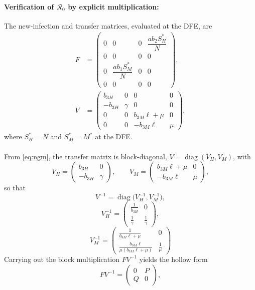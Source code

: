 \documentclass[a4paper,fleqn]{cas-dc}
\begin{document}
\paragraph{Verification of $\mathcal{R}_0$ by explicit multiplication:}
\label{app:ngm_verify}

The new-infection and transfer matrices, evaluated at the DFE, are
\begin{equation}
\begin{aligned}
F &= \begin{pmatrix}
0 & 0 & 0 & \dfrac{ab_2 S_H^*}{N} \\
0 & 0 & 0 & 0 \\
0 & \dfrac{ab_1 S_M^*}{N} & 0 & 0 \\
0 & 0 & 0 & 0
\end{pmatrix}, \\[6pt]
V &= \begin{pmatrix}
b_{3H} & 0 & 0 & 0 \\
-b_{3H} & \gamma & 0 & 0 \\
0 & 0 & b_{3M}\ell + \mu & 0 \\
0 & 0 & -b_{3M}\ell & \mu
\end{pmatrix},
\end{aligned}
\label{eq:ngm}
\end{equation}
where $S_H^* = N$ and $S_M^* = M^*$ at the DFE.
\\\\
From \eqref{eq:ngm}, the transfer matrix is block-diagonal,
$V=\operatorname{diag}(V_H,V_M)$, with
$$
V_H=\begin{pmatrix} b_{3H} & 0 \\ -b_{3H} & \gamma \end{pmatrix}, \qquad
V_M=\begin{pmatrix} b_{3M}\ell+\mu & 0 \\ -b_{3M}\ell & \mu \end{pmatrix},
$$
so that
$$V^{-1}=\operatorname{diag}\big(V_H^{-1},V_M^{-1}\big),$$
$$V_H^{-1}=\begin{pmatrix} \frac{1}{b_{3H}} & 0 \\ \frac{1}{\gamma} & \frac{1}{\gamma} \end{pmatrix},$$
$$V_M^{-1}=\begin{pmatrix} \frac{1}{b_{3M}\ell+\mu} & 0 \\ \frac{b_{3M}\ell}{\mu(b_{3M}\ell+\mu)} & \frac{1}{\mu} \end{pmatrix}$$
Carrying out the block multiplication $FV^{-1}$ yields the hollow form
$$FV^{-1}=\begin{pmatrix} 0 & P \\ Q & 0 \end{pmatrix},$$
\end{document}
